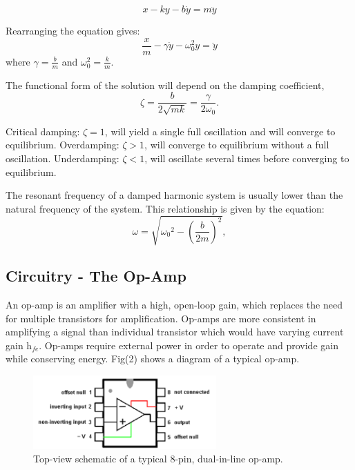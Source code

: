 \documentclass[journal]{Imperial_lab_report}
\begin{document}
\begin{equation}
    x - ky - b\dot{y} = m\ddot{y}
\end{equation}

Rearranging the equation gives:
\begin{equation}
    \frac{x}{m} - \gamma \dot{y} - \omega_{0}^{2}y = \ddot{y}
\end{equation}
where $\gamma = \frac{b}{m}$ and $\omega_{0}^{2} = \frac{k}{m}$.

The functional form of the solution will depend on the damping coefficient,
\begin{equation*}\label{diff equation}
    \zeta = \frac{b}{2\sqrt{mk}} = \frac{\gamma}{2\omega_{0}}.
\end{equation*}

Critical damping: $\zeta = 1$, will yield a single full oscillation and will converge to equilibrium. Overdamping: $\zeta > 1$, will converge to equilibrium without a full oscillation. Underdamping: $\zeta < 1$, will oscillate several times before converging to equilibrium.\cite{dampedfreq}



The resonant frequency of a damped harmonic system is usually lower than the natural frequency of the system. This relationship is given by the equation:
\begin{equation}\label{resonant frequency}
    \omega = \sqrt{{\omega_0}^2 - (\frac{b}{2m})^2},
\end{equation}





\subsection{Circuitry - The Op-Amp}

An op-amp \cite{op-amp} is an amplifier with a high, open-loop gain, which replaces the need for multiple transistors for amplification. Op-amps are more consistent in amplifying a signal than individual transistor which would have varying current gain h$_{fe}$. Op-amps require external power in order to operate and provide gain while conserving energy. Fig(2) shows a diagram of a typical op-amp.
\begin{figure}[h]
    \centering
    \includegraphics[width=7cm]{8pin op-amp.png}
    \caption{Top-view schematic of a typical 8-pin, dual-in-line op-amp.\cite{op-amp}}
    
    \label{fig:op-amp}
\end{figure}
\end{document}
